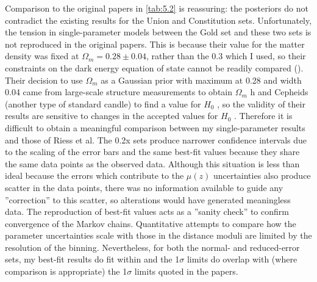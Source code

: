 Comparison to the original papers in \cref{tab:5.2} is reassuring: the posteriors do not contradict the existing results for the Union and Constitution sets. Unfortunately, the tension in single-parameter models between the Gold set and these two sets is not reproduced in the original papers. This is because their value for the matter density was fixed at $\Omega_m = 0.28 \pm 0.04$, rather than the 0.3 which I used, so their constraints on the dark energy equation of state cannot be readily compared (\cite{Riess2007}). Their decision to use $\Omega_m$ as a Gaussian prior with maximum at 0.28 and width 0.04 came from large-scale structure measurements to obtain $\Omega_m$ h and Cepheids (another type of standard candle) to find a value for $H_0$ \cite{Riess2007}, so the validity of their results are sensitive to changes in the accepted values for $H_0$ . Therefore it is difficult to obtain a meaningful comparison between my single-parameter results and those of Riess et al. The 0.2x sets produce narrower confidence intervals due to the scaling of the error bars and the same best-fit values because they share the same data points as the observed data. Although this situation is less than ideal because the errors which contribute to the $\mu(z)$ uncertainties also produce scatter in the data points, there was no information available to guide any ”correction” to this scatter, so alterations would have generated meaningless data. The reproduction of best-fit values acts as a ”sanity check” to confirm convergence of the Markov chains. Quantitative attempts to compare how the parameter uncertainties scale with those in the distance moduli are limited by the resolution of the binning. Nevertheless, for both the normal- and reduced-error sets, my best-fit results do fit within and the 1$\sigma$ limits do overlap with (where comparison is appropriate) the 1$\sigma$ limits quoted in the papers.
